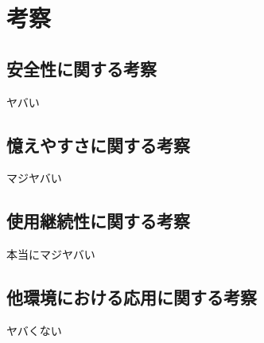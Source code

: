 \chapter{考察}\label{chap:discussion}

\section{安全性に関する考察}\label{sec:safety}
ヤバい

\section{憶えやすさに関する考察}\label{sec:memorable}
マジヤバい

\section{使用継続性に関する考察}\label{sec:continuity}
本当にマジヤバい

\section{他環境における応用に関する考察}\label{sec:application}
ヤバくない

\newpage

